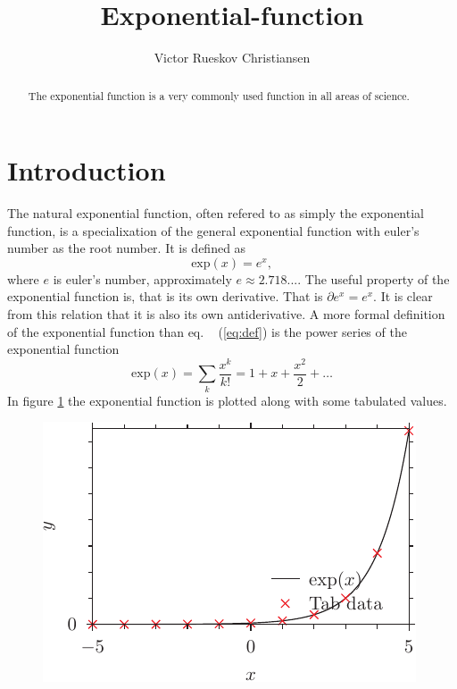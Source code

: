 \documentclass[twocolumn, a4paper, 12pt]{article}
\begin{document}
\title{Exponential-function}
\author{Victor Rueskov Christiansen}
\maketitle

\begin{abstract}
The exponential function is a very commonly used function in all areas of science.

\end{abstract}

\section{Introduction}
The natural exponential function, often refered to as simply the exponential function, is a specialixation of the general exponential function with euler's number as the root number. It is defined as
\begin{equation}\label{eq:def}
	\mathrm{exp}(x) = e^x,
\end{equation}
where $e$ is euler's number, approximately $e \approx 2.718...$. The useful property of the exponential function is, that is its own derivative. That is $\partial e^x = e^x$. It is clear from this relation that it is also its own antiderivative.
A more formal definition of the exponential function than eq. ~ (\ref{eq:def}) is the power series of the exponential function
\begin{equation} \label{eq:pow}
	\mathrm{exp}(x) = \sum_k \frac{x^k}{k!} = 1 + x + \frac{x^2}{2} + \dots
\end{equation}
In figure \ref{fig:exp} the exponential function is plotted along with some tabulated values.

\begin{figure}[h]\label{fig:exp}
	\includegraphics{exp_pyx.pdf}
\end{figure}
\end{document}
